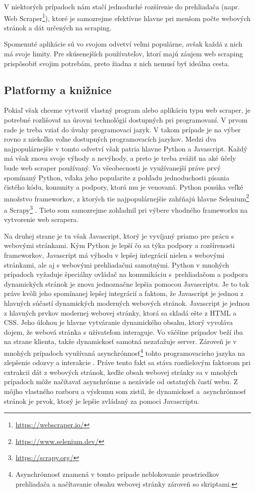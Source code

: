 V niektorých prípadoch nám stačí jednoduché rozšírenie do prehliadača (napr. Web Scraper\footnote{\url{https://webscraper.io/}}), ktoré je samozrejme efektívne hlavne pri menšom počte webových stránok a dát určených na scraping. 

Spomenuté aplikácie sú vo svojom odvetví veľmi populárne, avšak každá z nich má svoje limity. Pre skúsenejších používateľov, ktorí majú záujem web scraping prispôsobiť svojim potrebám, preto žiadna z nich nemusí byť ideálna cesta.

\subsection{Platformy a knižnice}

Pokiaľ však chceme vytvoriť vlastný program alebo aplikáciu typu web scraper, je potrebné rozlišovať na úrovni technológií dostupných pri programovaní. V prvom rade je treba vziať do úvahy programovací jazyk. V takom prípade je na výber rovno z niekoľko voľne dostupných programovacích jazykov. Medzi dva najpopulárnejšie v tomto odvetví však patria hlavne Python a Javascript. Každý má však znova svoje výhody a nevýhody, a preto je treba zvážiť na aké účely bude web scraper používaný. Vo všeobecnosti je využívanejší práve prvý spomínaný Python, vďaka jeho popularite z pohľadu jednoduchosti písania čistého kódu, komunity a podpory, ktorá mu je venovaná. Python ponúka veľké množstvo frameworkov, z ktorých tie najpopulárnejšie zahŕňajú hlavne Selenium\footnote{\url{https://www.selenium.dev/}} a Scrapy\footnote{\url{https://scrapy.org/}} \cite{The5Best}. Tieto som samozrejme zohľadnil pri výbere vhodného frameworku na vytvorenie web scrapera.

Na druhej strane je tu však Javascript, ktorý je vyvíjaný priamo pre prácu s webovými stránkami. Kým Python je lepší čo sa týka podpory a rozšírenosti frameworkov, Javascript má výhodu v lepšej integrácií nielen s webovými stránkami, ale aj s webovými prehliadačmi samotnými. Python v mnohých prípadoch vyžaduje špeciálny ovládač na komunikáciu s~prehliadačom a podpora dynamických stránok je znova jednoznačne lepšia pomocou Javascriptu. Je to tak práve kvôli jeho spomínanej lepšej integrácií a faktom, že Javascript je jednou z hlavných súčastí dynamických moderných webových stránok. Javascript je jednou z hlavných prvkov modernej webovej stránky, ktorá sa skladá ešte z HTML a CSS. Jeho úlohou je hlavne vytváranie dynamického obsahu, ktorý vyvoláva dojem, že webová stránka s užívateľom interaguje. Vo väčšine prípadov beží iba na strane klienta, takže dynamickosť samotná nezaťažuje server. Zároveň je v mnohých prípadoch využívaná asynchrónnosť\footnote{Asynchrónnosť znamená v tomto prípade neblokovanie prostriedkov prehliadača a načítavanie obsahu webovej stránky zároveň so skriptami.} tohto programovacieho jazyka na zlepšenie odozvy a interakcie \cite{Javascript}. Práve tento fakt sa stáva rozdielovým faktorom pri extrakcii dát z webových stránok, keďže obsah webovej stránky sa v mnohých prípadoch môže načítavať asynchrónne a nezávisle od ostatných častí webu. Z môjho vlastného rozboru a výskumu som zistil, že dynamickosť a~asynchrónnosť stránok je prvok, ktorý je lepšie zvládaný za pomoci Javascriptu.


